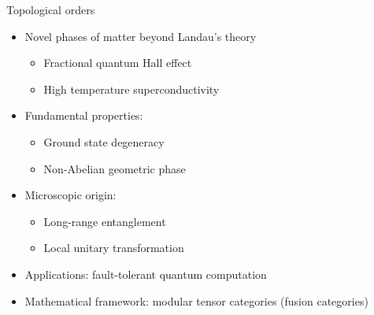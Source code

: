 \documentclass{fdubeamer}
\newcommand{\1}{\mathbb{1}}
\begin{document}
\begin{frame}{Topological orders}

\begin{itemize}
  \item Novel phases of matter beyond Landau's theory

    \begin{itemize}
      \item Fractional quantum Hall effect
      \item High temperature superconductivity
    \end{itemize}

  \item Fundamental properties:

    \begin{itemize}
      \item Ground state degeneracy
      \item Non-Abelian geometric phase
    \end{itemize}

  \item Microscopic origin:

    \begin{itemize}
      \item Long-range entanglement
      \item Local unitary transformation
    \end{itemize}

  \item Applications: fault-tolerant quantum computation
  \item Mathematical framework: modular tensor categories (fusion categories)
\end{itemize}

\end{frame}
\end{document}
